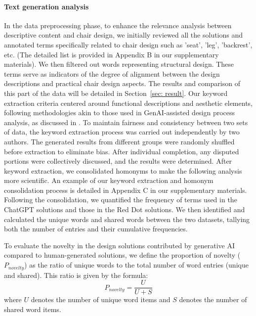 \paragraph{\textbf{Text generation analysis}}
In the data preprocessing phase, to enhance the relevance analysis between descriptive content and chair design, we initially reviewed all the solutions and annotated terms specifically related to chair design such as 'seat', 'leg', 'backrest', etc. (The detailed list is provided in Appendix B in our supplementary materials). We then filtered out words representing structural design. These terms serve as indicators of the degree of alignment between the design descriptions and practical chair design aspects. The results and comparison of this part of the data will be detailed in Section~\ref{sec: result}. Our keyword extraction criteria centered around functional descriptions and aesthetic elements, following methodologies akin to those used in GenAI-assisted design process analysis, as discussed in \cite{chen2024designfusion}. To maintain fairness and consistency between two sets of data, the keyword extraction process was carried out independently by two authors. The generated results from different groups were randomly shuffled before extraction to eliminate bias. After individual completion, any disputed portions were collectively discussed, and the results were determined. After keyword extraction, we consolidated homonyms to make the following analysis more scientific. An example of our keyword extraction and homonym consolidation process is detailed in Appendix C in our supplementary materials. Following the consolidation, we quantified the frequency of terms used in the ChatGPT solutions and those in the Red Dot solutions. We then identified and calculated the unique words and shared words between the two datasets, tallying both the number of entries and their cumulative frequencies.

To evaluate the novelty in the design solutions contributed by generative AI compared to human-generated solutions, we define the proportion of novelty ($P_{novelty}$) as the ratio of unique words to the total number of word entries (unique and shared). This ratio is given by the formula:
\begin{equation}
P_{novelty} = \frac{U}{U + S}
\label{eq:novelty_ratio}
\end{equation}
where $U$ denotes the number of unique word items and $S$ denotes the number of shared word items.

